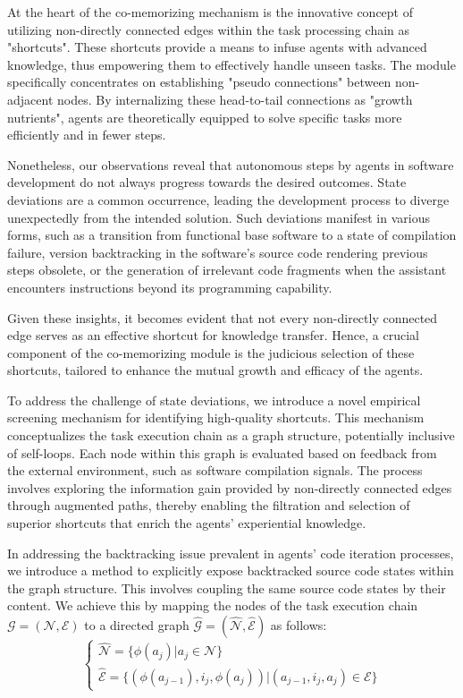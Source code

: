 \documentclass[11pt]{article}
\begin{document}
At the heart of the co-memorizing mechanism is the innovative concept of utilizing non-directly connected edges within the task processing chain as "shortcuts". These shortcuts provide a means to infuse agents with advanced knowledge, thus empowering them to effectively handle unseen tasks. The module specifically concentrates on establishing "pseudo connections" between non-adjacent nodes. By internalizing these head-to-tail connections as "growth nutrients", agents are theoretically equipped to solve specific tasks more efficiently and in fewer steps.

Nonetheless, our observations reveal that autonomous steps by agents in software development do not always progress towards the desired outcomes. State deviations are a common occurrence, leading the development process to diverge unexpectedly from the intended solution. Such deviations manifest in various forms, such as a transition from functional base software to a state of compilation failure, version backtracking in the software’s source code rendering previous steps obsolete, or the generation of irrelevant code fragments when the assistant encounters instructions beyond its programming capability.

Given these insights, it becomes evident that not every non-directly connected edge serves as an effective shortcut for knowledge transfer. Hence, a crucial component of the co-memorizing module is the judicious selection of these shortcuts, tailored to enhance the mutual growth and efficacy of the agents.

To address the challenge of state deviations, we introduce a novel empirical screening mechanism for identifying high-quality shortcuts. This mechanism conceptualizes the task execution chain as a graph structure, potentially inclusive of self-loops. Each node within this graph is evaluated based on feedback from the external environment, such as software compilation signals. The process involves exploring the information gain provided by non-directly connected edges through augmented paths, thereby enabling the filtration and selection of superior shortcuts that enrich the agents' experiential knowledge.

In addressing the backtracking issue prevalent in agents' code iteration processes, we introduce a method to explicitly expose backtracked source code states within the graph structure. This involves coupling the same source code states by their content. We achieve this by mapping the nodes of the task execution chain \( \mathcal{G} = (\mathcal{N}, \mathcal{E}) \) to a directed graph \( \hat{\mathcal{G}} = (\hat{\mathcal{N}}, \hat{\mathcal{E}}) \) as follows:
\[
\left\{
\begin{array}{ll}
\hat{\mathcal{N}} = \{ \phi(a_j) | a_j \in \mathcal{N} \} \\
\hat{\mathcal{E}} = \{ (\phi(a_{j-1}), i_j, \phi(a_j)) | (a_{j-1}, i_j, a_j) \in \mathcal{E} \}
\end{array}
\right.
\]
\end{document}

